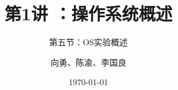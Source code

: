 


\title[第1讲]{第1讲 ：操作系统概述} %
\subtitle{第五节：OS实验概述}
\author{向勇、陈渝、李国良} %
\date{\today} %



\begin{frame}
\titlepage %
\end{frame}

%
%


